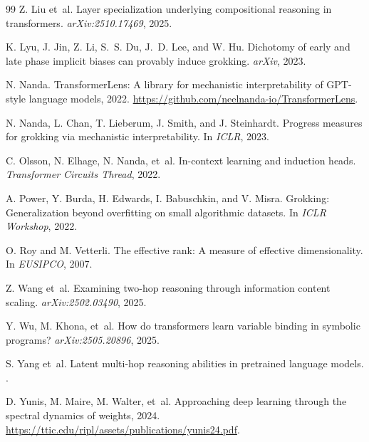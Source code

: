 \documentclass{article}
\begin{document}
\begin{thebibliography}{99}
Z. Liu et~al.
\newblock Layer specialization underlying compositional reasoning in transformers.
\newblock \emph{arXiv:2510.17469}, 2025.

K. Lyu, J. Jin, Z. Li, S.~S. Du, J.~D. Lee, and W. Hu.
\newblock Dichotomy of early and late phase implicit biases can provably induce grokking.
\newblock \emph{arXiv}, 2023.

N. Nanda.
\newblock TransformerLens: A library for mechanistic interpretability of GPT-style language models, 2022.
\newblock \url{https://github.com/neelnanda-io/TransformerLens}.

N. Nanda, L. Chan, T. Lieberum, J. Smith, and J. Steinhardt.
\newblock Progress measures for grokking via mechanistic interpretability.
\newblock In \emph{ICLR}, 2023.

C. Olsson, N. Elhage, N. Nanda, et~al.
\newblock In-context learning and induction heads.
\newblock \emph{Transformer Circuits Thread}, 2022.

A. Power, Y. Burda, H. Edwards, I. Babuschkin, and V. Misra.
\newblock Grokking: Generalization beyond overfitting on small algorithmic datasets.
\newblock In \emph{ICLR Workshop}, 2022.

O. Roy and M. Vetterli.
\newblock The effective rank: A measure of effective dimensionality.
\newblock In \emph{EUSIPCO}, 2007.

Z. Wang et~al.
\newblock Examining two-hop reasoning through information content scaling.
\newblock \emph{arXiv:2502.03490}, 2025.

Y. Wu, M. Khona, et~al.
\newblock How do transformers learn variable binding in symbolic programs?
\newblock \emph{arXiv:2505.20896}, 2025.

S. Yang et~al.
\newblock Latent multi-hop reasoning abilities in pretrained language models.
.

D. Yunis, M. Maire, M. Walter, et~al.
\newblock Approaching deep learning through the spectral dynamics of weights, 2024.
\newblock \url{https://ttic.edu/ripl/assets/publications/yunis24.pdf}.

\end{thebibliography}
\end{document}
